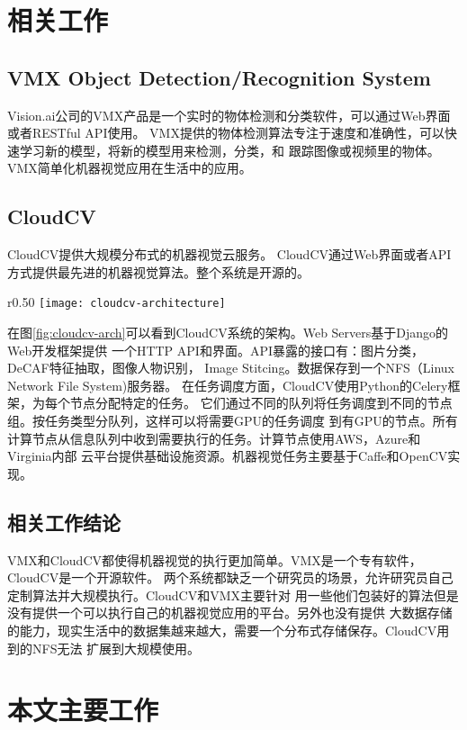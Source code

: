 \section{相关工作}
\label{sec:related_work}

\subsection{VMX Object Detection/Recognition System}
Vision.ai公司的VMX产品是一个实时的物体检测和分类软件，可以通过Web界面或者RESTful API使用。
VMX提供的物体检测算法专注于速度和准确性，可以快速学习新的模型，将新的模型用来检测，分类，和
跟踪图像或视频里的物体。VMX简单化机器视觉应用在生活中的应用。

\subsection{CloudCV}
CloudCV提供大规模分布式的机器视觉云服务。
CloudCV通过Web界面或者API方式提供最先进的机器视觉算法。整个系统是开源的。\cite{cloudcv2015}

\begin{wrapfigure}{r}{0.50\textwidth}
  \centering
    \texttt{[image: cloudcv-architecture]}
    \caption{CloudCV系统架构。\cite{cloudcv2015}}
  \label{fig:cloudcv-arch}
\end{wrapfigure}
在图\ref{fig:cloudcv-arch}可以看到CloudCV系统的架构。Web Servers基于Django的Web开发框架提供
一个HTTP API和界面。API暴露的接口有：图片分类，DeCAF特征抽取，图像人物识别，
Image Stitcing。数据保存到一个NFS（Linux Network File System)服务器。
在任务调度方面，CloudCV使用Python的Celery框架，为每个节点分配特定的任务。
它们通过不同的队列将任务调度到不同的节点组。按任务类型分队列，这样可以将需要GPU的任务调度
到有GPU的节点。所有计算节点从信息队列中收到需要执行的任务。计算节点使用AWS，Azure和Virginia内部
云平台提供基础设施资源。机器视觉任务主要基于Caffe和OpenCV实现。

\subsection{相关工作结论}
VMX和CloudCV都使得机器视觉的执行更加简单。VMX是一个专有软件，CloudCV是一个开源软件。
两个系统都缺乏一个研究员的场景，允许研究员自己定制算法并大规模执行。CloudCV和VMX主要针对
用一些他们包装好的算法但是没有提供一个可以执行自己的机器视觉应用的平台。另外也没有提供
大数据存储的能力，现实生活中的数据集越来越大，需要一个分布式存储保存。CloudCV用到的NFS无法
扩展到大规模使用。

\section{本文主要工作}
\label{sec:main_work}

